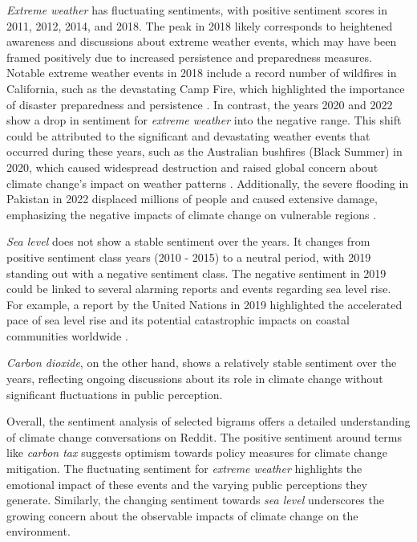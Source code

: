 \emph{Extreme weather} has fluctuating sentiments, with positive sentiment scores in 2011, 2012, 2014, and 2018. The peak in 2018 likely corresponds to heightened awareness and discussions about extreme weather events, which may have been framed positively due to increased persistence and preparedness measures. Notable extreme weather events in 2018 include a record number of wildfires in California, such as the devastating Camp Fire, which highlighted the importance of disaster preparedness and persistence \cite{CalFire2018}.
In contrast, the years 2020 and 2022 show a drop in sentiment for \emph{extreme weather} into the negative range. This shift could be attributed to the significant and devastating weather events that occurred during these years, such as the Australian bushfires (Black Summer) in 2020, which caused widespread destruction and raised global concern about climate change's impact on weather patterns \cite{BBC2020}. Additionally, the severe flooding in Pakistan in 2022 displaced millions of people and caused extensive damage, emphasizing the negative impacts of climate change on vulnerable regions \cite{cordaid2022}.

\emph{Sea level} does not show a stable sentiment over the years. It changes from positive sentiment class years (2010 - 2015) to a neutral period, with 2019 standing out with a negative sentiment class. The negative sentiment in 2019 could be linked to several alarming reports and events regarding sea level rise. For example, a report by the United Nations in 2019 highlighted the accelerated pace of sea level rise and its potential catastrophic impacts on coastal communities worldwide \cite{UN2019}.

\emph{Carbon dioxide}, on the other hand, shows a relatively stable sentiment over the years, reflecting ongoing discussions about its role in climate change without significant fluctuations in public perception.

Overall, the sentiment analysis of selected bigrams offers a detailed understanding of climate change conversations on Reddit. The positive sentiment around terms like \emph{carbon tax} suggests optimism towards policy measures for climate change mitigation. The fluctuating sentiment for \emph{extreme weather} highlights the emotional impact of these events and the varying public perceptions they generate. Similarly, the changing sentiment towards \emph{sea level} underscores the growing concern about the observable impacts of climate change on the environment.

